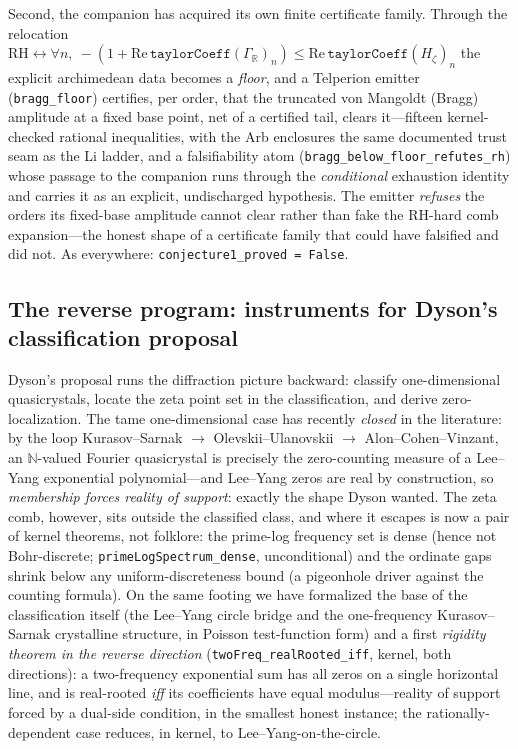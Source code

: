 Second, the companion has acquired its own finite certificate family. Through the
relocation $\mathrm{RH} \leftrightarrow \forall n,\ -(1 +
\mathrm{Re}\,\texttt{taylorCoeff}(\Gamma_{\mathbb R})_n) \le
\mathrm{Re}\,\texttt{taylorCoeff}(H_\zeta)_n$ the explicit archimedean data
becomes a \emph{floor}, and a Telperion emitter (\texttt{bragg\_floor}) certifies,
per order, that the truncated von Mangoldt (Bragg) amplitude at a fixed base
point, net of a certified tail, clears it---fifteen kernel-checked rational
inequalities, with the Arb enclosures the same documented trust seam as the Li
ladder, and a falsifiability atom
(\texttt{bragg\_below\_floor\_refutes\_rh}) whose passage to the companion runs
through the \emph{conditional} exhaustion identity and carries it as an explicit,
undischarged hypothesis. The emitter \emph{refuses} the orders its fixed-base
amplitude cannot clear rather than fake the RH-hard comb expansion---the honest
shape of a certificate family that could have falsified and did not. As
everywhere: \texttt{conjecture1\_proved = False}.

\subsection{The reverse program: instruments for Dyson's classification proposal}
\label{sec:mirrormere}

Dyson's proposal runs the diffraction picture backward: classify
one-dimensional quasicrystals, locate the zeta point set in the
classification, and derive zero-localization. The tame one-dimensional case
has recently \emph{closed} in the literature: by the loop
Kurasov--Sarnak $\to$ Olevskii--Ulanovskii $\to$ Alon--Cohen--Vinzant, an
$\mathbb{N}$-valued Fourier quasicrystal is precisely the zero-counting
measure of a Lee--Yang exponential polynomial---and Lee--Yang zeros are real
by construction, so \emph{membership forces reality of support}: exactly the
shape Dyson wanted. The zeta comb, however, sits outside the classified
class, and where it escapes is now a pair of kernel theorems, not folklore: the
prime-log frequency set is dense (hence not Bohr-discrete;
\texttt{primeLogSpectrum\_dense}, unconditional) and the ordinate gaps shrink
below any uniform-discreteness bound (a pigeonhole driver against the
counting formula). On the same footing we have formalized the base of the
classification itself (the Lee--Yang circle bridge and the one-frequency
Kurasov--Sarnak crystalline structure, in Poisson test-function form) and a
first \emph{rigidity theorem in the reverse direction}
(\texttt{twoFreq\_realRooted\_iff}, kernel, both directions): a two-frequency
exponential sum has all zeros on a single horizontal line, and is real-rooted
\emph{iff} its coefficients have equal modulus---reality of support forced by
a dual-side condition, in the smallest honest instance; the
rationally-dependent case reduces, in kernel, to Lee--Yang-on-the-circle.

